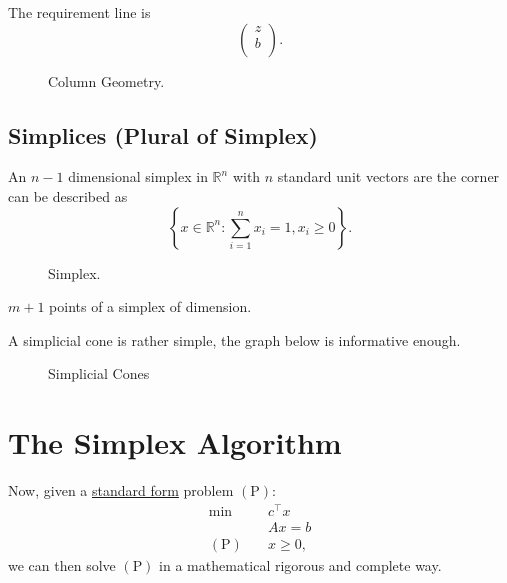 The requirement line is
\[
	\begin{pmatrix}
		z \\
		b \\
	\end{pmatrix}.
\]

\begin{figure}[H]
	\centering
	\caption{Column Geometry.}
	\label{fig:column-geometry}
\end{figure}

\subsection{Simplices (Plural of Simplex)}
\begin{eg}[Simplex]
	An \(n-1\) dimensional simplex in \(\mathbb{R}^n\) with \(n\) standard unit vectors are the corner can be described as
	\[
		\left\{x\in \mathbb{R}^n \colon \sum\limits_{i=1}^{n} x_i = 1, x_i \geq 0\right\}.
	\]
	\begin{figure}[H]
		\centering
		\caption{Simplex.}
		\label{fig:simplex}
	\end{figure}
\end{eg}

\begin{note}
	\(m+1\) points of a simplex of dimension.
\end{note}

A simplicial cone is rather simple, the graph below is informative enough.
\begin{figure}[H]
	\centering
	\caption{Simplicial Cones}
	\label{fig:simplicial-cones}
\end{figure}

\section{The Simplex Algorithm}
Now, given a \hyperref[def:standard-form]{standard form} problem \((\mathrm{P})\):
\[
	\begin{aligned}
		\min~             & c^{\top}x \\
		                  & Ax = b    \\
		(\mathrm{P})\quad & x\geq 0,
	\end{aligned}
\]
we can then solve \((\mathrm{P})\) in a mathematical rigorous and complete way.


